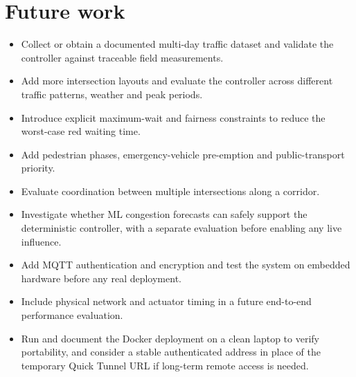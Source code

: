 \documentclass[12pt,a4paper,oneside]{report}
\begin{document}
\section{Future work}
\begin{itemize}
  \item Collect or obtain a documented multi-day traffic dataset and validate the controller against traceable field measurements.
  \item Add more intersection layouts and evaluate the controller across different traffic patterns, weather and peak periods.
  \item Introduce explicit maximum-wait and fairness constraints to reduce the worst-case red waiting time.
  \item Add pedestrian phases, emergency-vehicle pre-emption and public-transport priority.
  \item Evaluate coordination between multiple intersections along a corridor.
  \item Investigate whether ML congestion forecasts can safely support the deterministic controller, with a separate evaluation before enabling any live influence.
  \item Add MQTT authentication and encryption and test the system on embedded hardware before any real deployment.
  \item Include physical network and actuator timing in a future end-to-end performance evaluation.
  \item Run and document the Docker deployment on a clean laptop to verify portability, and consider a stable authenticated address in place of the temporary Quick Tunnel URL if long-term remote access is needed.
\end{itemize}
\end{document}
